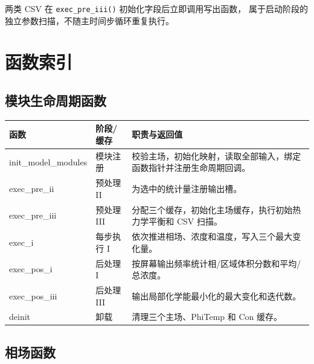 \documentclass[UTF8,a4paper,11pt]{ctexart}
\newcommand{\code}[1]{\texttt{#1}}
\begin{document}
两类 CSV 在 \code{exec\_pre\_iii()} 初始化字段后立即调用写出函数，
属于启动阶段的独立参数扫描，不随主时间步循环重复执行。

\section{函数索引}

\subsection{模块生命周期函数}

\begin{longtable}{>{\ttfamily}p{}p{}p{}}
\toprule
\normalfont 函数 & 阶段/缓存 & 职责与返回值\\
\midrule
\endhead
init\_model\_modules & 模块注册 & 校验主场，初始化映射，读取全部输入，绑定函数指针并注册生命周期回调。\\
exec\_pre\_ii & 预处理 II & 为选中的统计量注册输出槽。\\
exec\_pre\_iii & 预处理 III & 分配三个缓存，初始化主场缓存，执行初始热力学平衡和 CSV 扫描。\\
exec\_i & 每步执行 I & 依次推进相场、浓度和温度，写入三个最大变化量。\\
exec\_pos\_i & 后处理 I & 按屏幕输出频率统计相/区域体积分数和平均/总浓度。\\
exec\_pos\_iii & 后处理 III & 输出局部化学能最小化的最大变化和迭代数。\\
deinit & 卸载 & 清理三个主场、PhiTemp 和 Con 缓存。\\
\bottomrule
\end{longtable}

\subsection{相场函数}
\end{document}
